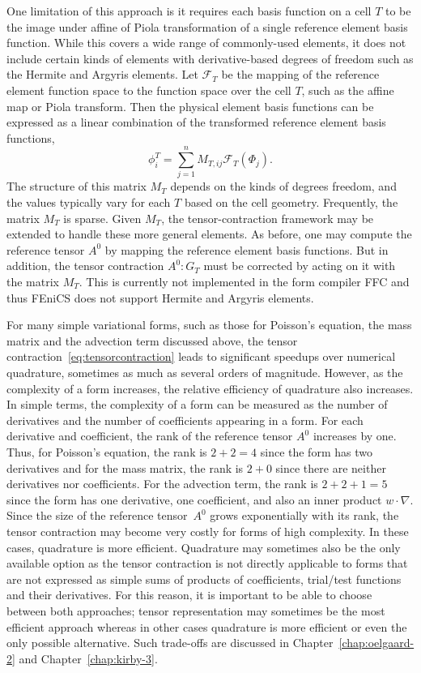 One limitation of this approach is it requires each basis function on
a cell \( T \) to be the image under affine of Piola transformation of
a single reference element basis function.  While this covers a wide
range of commonly-used elements, it does not include certain kinds of
elements with derivative-based degrees of freedom such as the Hermite
and Argyris elements. Let \( \mathcal{F}_T \) be the mapping of the
reference element function space to the function space over the cell
$T$, such as the affine map or Piola transform. Then the physical
element basis functions can be expressed as a linear combination of
the transformed reference element basis functions,
\begin{equation}
  \phi^T_i = \sum_{j=1}^n M_{T,{ij}} \mathcal{F}_T \left( \Phi_j \right).
\end{equation}
The structure of this matrix \( M_T \) depends on the kinds of degrees
freedom, and the values typically vary for each \( T \) based on the
cell geometry.  Frequently, the matrix $M_T$ is sparse. Given \( M_T
\), the tensor-contraction framework may be extended to handle these
more general elements.  As before, one may compute the reference
tensor \( A^0 \) by mapping the reference element basis functions. But
in addition, the tensor contraction \( A^0 : G_T \) must be corrected
by acting on it with the matrix \( M_T \). This is currently not
implemented in the form compiler FFC and thus FEniCS does not support
Hermite and Argyris elements.

For many simple variational forms, such as those for Poisson's
equation, the mass matrix and the advection term discussed above, the
tensor contraction~\eqref{eq:tensorcontraction} leads to significant
speedups over numerical quadrature, sometimes as much as several
orders of magnitude.  However, as the complexity of a form increases,
the relative efficiency of quadrature also increases. In simple terms,
the complexity of a form can be measured as the number of derivatives
and the number of coefficients appearing in a form. For each
derivative and coefficient, the rank of the reference tensor $A^0$
increases by one. Thus, for Poisson's equation, the rank is $2 + 2 =
4$ since the form has two derivatives and for the mass matrix, the
rank is $2 + 0$ since there are neither derivatives nor
coefficients. For the advection term, the rank is $2 + 2 + 1 = 5$
since the form has one derivative, one coefficient, and also an inner
product $w \cdot \nabla$. Since the size of the reference tensor~$A^0$
grows exponentially with its rank, the tensor contraction may become
very costly for forms of high complexity. In these cases, quadrature
is more efficient. Quadrature may sometimes also be the only available
option as the tensor contraction is not directly applicable to forms
that are not expressed as simple sums of products of coefficients,
trial/test functions and their derivatives. For this reason, it is
important to be able to choose between both approaches; tensor
representation may sometimes be the most efficient approach whereas in
other cases quadrature is more efficient or even the only possible
alternative.  Such trade-offs are discussed in
Chapter~\ref{chap:oelgaard-2} and Chapter~\ref{chap:kirby-3}.
